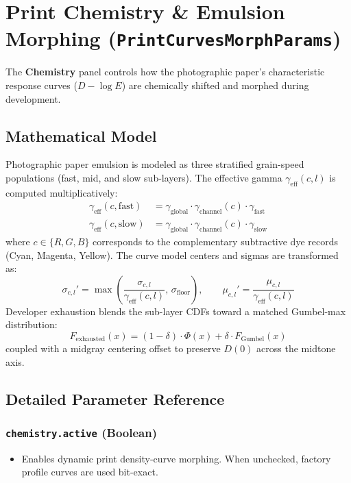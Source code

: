 \documentclass[11pt,a4paper]{article}
\begin{document}
\section{Print Chemistry \& Emulsion Morphing (\texttt{PrintCurvesMorphParams})}

The \textbf{Chemistry} panel controls how the photographic paper's characteristic response curves ($D-\log E$) are chemically shifted and morphed during development.

\subsection{Mathematical Model}
Photographic paper emulsion is modeled as three stratified grain-speed populations (fast, mid, and slow sub-layers). The effective gamma $\gamma_{\text{eff}}(c, l)$ is computed multiplicatively:
\begin{align}
\gamma_{\text{eff}}(c, \text{fast}) &= \gamma_{\text{global}} \cdot \gamma_{\text{channel}}(c) \cdot \gamma_{\text{fast}} \\
\gamma_{\text{eff}}(c, \text{slow}) &= \gamma_{\text{global}} \cdot \gamma_{\text{channel}}(c) \cdot \gamma_{\text{slow}}
\end{align}
where $c \in \{R, G, B\}$ corresponds to the complementary subtractive dye records (Cyan, Magenta, Yellow). The curve model centers and sigmas are transformed as:
\begin{equation}
\sigma_{c, l}' = \max\left(\frac{\sigma_{c, l}}{\gamma_{\text{eff}}(c, l)},\, \sigma_{\text{floor}}\right), \qquad \mu_{c, l}' = \frac{\mu_{c, l}}{\gamma_{\text{eff}}(c, l)}
\end{equation}
Developer exhaustion blends the sub-layer CDFs toward a matched Gumbel-max distribution:
\begin{equation}
F_{\text{exhausted}}(x) = (1 - \delta) \cdot \Phi(x) + \delta \cdot F_{\text{Gumbel}}(x)
\end{equation}
coupled with a midgray centering offset to preserve $D(0)$ across the midtone axis.

\subsection{Detailed Parameter Reference}

\subsubsection{\texttt{chemistry.active} (Boolean)}
\begin{itemize}[leftmargin=*]
    \item Enables dynamic print density-curve morphing. When unchecked, factory profile curves are used bit-exact.
\end{itemize}
\end{document}
